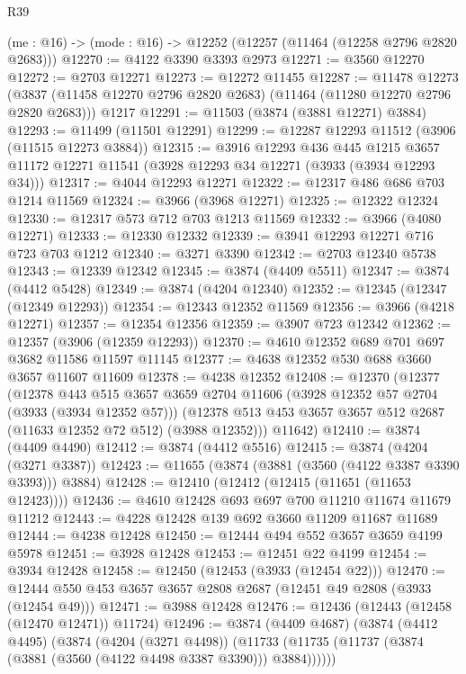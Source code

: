 \begin{lexlean}{R39}
\begin{coremodule}
  (me : @16) -> (mode : @16) -> @12252 (@12257 (@11464 (@12258 @2796 @2820 @2683)))
@12270 := @4122 @3390 @3393 @2973
@12271 := @3560 @12270
@12272 := @2703 @12271
@12273 := @12272 @11455
@12287 := @11478
    @12273
    (@3837 (@11458 @12270 @2796 @2820 @2683) (@11464 (@11280 @12270 @2796 @2820 @2683)))
    @1217
@12291 := @11503 (@3874 (@3881 @12271) @3884)
@12293 := @11499 (@11501 @12291)
@12299 := @12287 @12293 @11512 (@3906 (@11515 @12273 @3884))
@12315 := @3916
    @12293
    @436
    @445
    @1215
    @3657
    @11172
    @12271
    @11541
    (@3928 @12293 @34 @12271 (@3933 (@3934 @12293 @34)))
@12317 := @4044 @12293 @12271
@12322 := @12317 @486 @686 @703 @1214 @11569
@12324 := @3966 (@3968 @12271)
@12325 := @12322 @12324
@12330 := @12317 @573 @712 @703 @1213 @11569
@12332 := @3966 (@4080 @12271)
@12333 := @12330 @12332
@12339 := @3941 @12293 @12271 @716 @723 @703 @1212
@12340 := @3271 @3390
@12342 := @2703 @12340 @5738
@12343 := @12339 @12342
@12345 := @3874 (@4409 @5511)
@12347 := @3874 (@4412 @5428)
@12349 := @3874 (@4204 @12340)
@12352 := @12345 (@12347 (@12349 @12293))
@12354 := @12343 @12352 @11569
@12356 := @3966 (@4218 @12271)
@12357 := @12354 @12356
@12359 := @3907 @723 @12342
@12362 := @12357 (@3906 (@12359 @12293))
@12370 := @4610 @12352 @689 @701 @697 @3682 @11586 @11597 @11145
@12377 := @4638 @12352 @530 @688 @3660 @3657 @11607 @11609
@12378 := @4238 @12352
@12408 := @12370
    (@12377
      (@12378
        @443
        @515
        @3657
        @3659
        @2704
        @11606
        (@3928 @12352 @57 @2704 (@3933 (@3934 @12352 @57)))
        (@12378 @513 @453 @3657 @3657 @512 @2687 (@11633 @12352 @72 @512) (@3988 @12352)))
      @11642)
@12410 := @3874 (@4409 @4490)
@12412 := @3874 (@4412 @5516)
@12415 := @3874 (@4204 (@3271 @3387))
@12423 := @11655 (@3874 (@3881 (@3560 (@4122 @3387 @3390 @3393))) @3884)
@12428 := @12410 (@12412 (@12415 (@11651 (@11653 @12423))))
@12436 := @4610 @12428 @693 @697 @700 @11210 @11674 @11679 @11212
@12443 := @4228 @12428 @139 @692 @3660 @11209 @11687 @11689
@12444 := @4238 @12428
@12450 := @12444 @494 @552 @3657 @3659 @4199 @5978
@12451 := @3928 @12428
@12453 := @12451 @22 @4199
@12454 := @3934 @12428
@12458 := @12450 (@12453 (@3933 (@12454 @22)))
@12470 := @12444 @550 @453 @3657 @3657 @2808 @2687 (@12451 @49 @2808 (@3933 (@12454 @49)))
@12471 := @3988 @12428
@12476 := @12436 (@12443 (@12458 (@12470 @12471)) @11724)
@12496 := @3874
    (@4409 @4687)
    (@3874
      (@4412 @4495)
      (@3874
        (@4204 (@3271 @4498))
        (@11733 (@11735 (@11737 (@3874 (@3881 (@3560 (@4122 @4498 @3387 @3390))) @3884))))))

\end{coremodule}
\end{lexlean}
